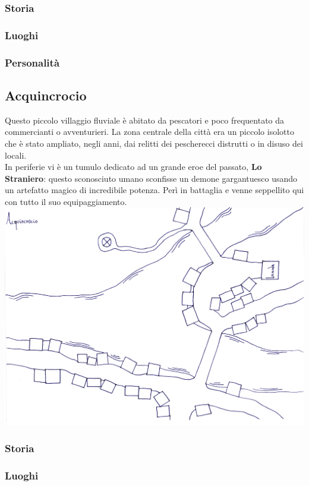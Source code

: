 \documentclass[10pt,twoside,onecolumn,openany]{book}
\begin{document}
\subsubsection{Storia}
\subsubsection{Luoghi}
\subsubsection{Personalità}
\newpage
\subsection{Acquincrocio}
Questo piccolo villaggio fluviale è abitato da pescatori e poco frequentato da commercianti o avventurieri. La zona centrale della città era un piccolo isolotto che è stato ampliato, negli anni, dai relitti dei pescherecci distrutti o in disuso dei locali.\\
In periferie vi è un tumulo dedicato ad un grande eroe del passato, \textbf{Lo Straniero}: questo sconosciuto umano sconfisse un demone gargantuesco usando un artefatto magico di incredibile potenza. Perì in battaglia e venne seppellito qui con tutto il suo equipaggiamento.\\
\includegraphics[scale=0.6]{Acquincrocio}
\subsubsection{Storia}
\subsubsection{Luoghi}
\end{document}
